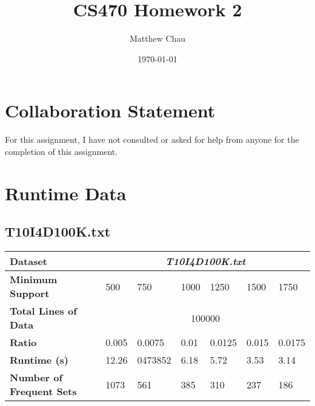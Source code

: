\documentclass[12pt]{article}
\title{CS470 Homework 2} %
\author{Matthew Chau\\ %
}
\date{\today} %
\begin{document}
\setlength{\droptitle}{-5em}
\maketitle


\section*{Collaboration Statement}
For this assignment, I have not consulted or asked for help from anyone for the completion of this assignment.


\section*{Runtime Data}
\subsection*{T10I4D100K.txt}
\begin{table}[h]
\begin{tabular}{|l|l|l|l|l|l|l|}
\hline
\textbf{Dataset}                 & \multicolumn{6}{c|}{\textit{T10I4D100K.txt}}     \\ \hline
\textbf{Minimum Support}         & 500   & 750     & 1000 & 1250   & 1500  & 1750   \\ \hline
\textbf{Total Lines of Data}     & \multicolumn{6}{c|}{100000}                      \\ \hline
\textbf{Ratio}                   & 0.005 & 0.0075  & 0.01 & 0.0125 & 0.015 & 0.0175 \\ \hline
\textbf{Runtime (s)}             & 12.26 & 0473852 & 6.18 & 5.72   & 3.53  & 3.14   \\ \hline
\textbf{Number of Frequent Sets} & 1073  & 561     & 385  & 310    & 237   & 186    \\ \hline
\end{tabular}
\end{table}

\end{document}

